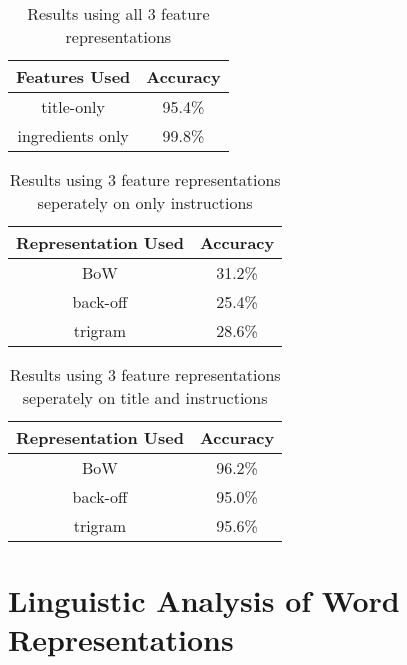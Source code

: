 \documentclass[paper=a4, fontsize=11pt]{scrartcl} %
\begin{document}
\begin{table}[h]
\centering
\label{tab:3results}
\caption{Results using all 3 feature representations}
\begin{tabular}{|c|c|}
\hline
 Features Used & Accuracy \\ \hline \hline
title-only & 95.4\% \\  \hline
ingredients only & 99.8\% \\ \hline
\end{tabular}
\end{table}


\begin{table}[h]
\centering
\label{tab:instructions only}
\caption{Results using 3 feature representations seperately on only instructions}
\begin{tabular}{|c|c|}
\hline
 Representation Used & Accuracy \\ \hline \hline
BoW & 31.2\% \\  \hline
back-off & 25.4\% \\ \hline
trigram & 28.6\% \\ \hline
\end{tabular}
\end{table}

\begin{table}[h]
\centering
\label{tab:instructions only}
\caption{Results using 3 feature representations seperately on title and instructions}
\begin{tabular}{|c|c|}
\hline
 Representation Used & Accuracy \\ \hline \hline
BoW & 96.2\% \\  \hline
back-off & 95.0\% \\ \hline
trigram & 95.6\% \\ \hline
\end{tabular}
\end{table}



\section{Linguistic Analysis of Word Representations}
\end{document}
